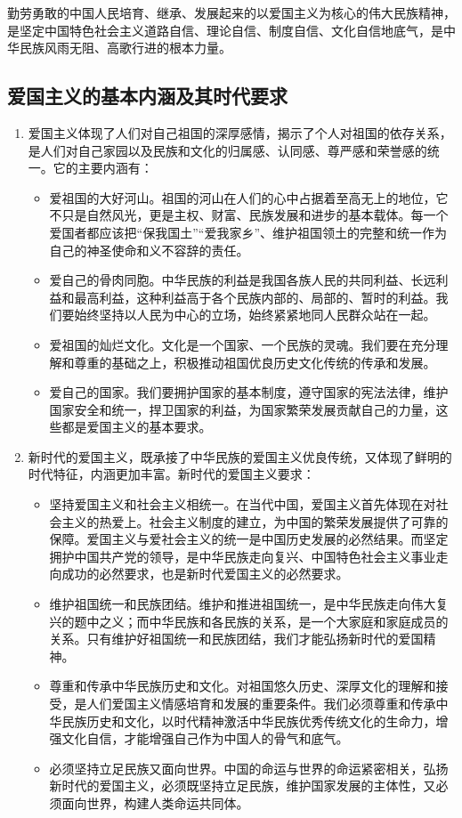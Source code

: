 勤劳勇敢的中国人民培育、继承、发展起来的以爱国主义为核心的伟大民族精神，是坚定中国特色社会主义道路自信、理论自信、制度自信、文化自信地底气，是中华民族风雨无阻、高歌行进的根本力量。

\subsection{爱国主义的基本内涵及其时代要求}
\begin{enumerate}
\item 爱国主义体现了人们对自己祖国的深厚感情，揭示了个人对祖国的依存关系，是人们对自己家园以及民族和文化的归属感、认同感、尊严感和荣誉感的统一。它的主要内涵有：
\begin{itemize}
\item 爱祖国的大好河山。祖国的河山在人们的心中占据着至高无上的地位，它不只是自然风光，更是主权、财富、民族发展和进步的基本载体。每一个爱国者都应该把“保我国土”“爱我家乡”、维护祖国领土的完整和统一作为自己的神圣使命和义不容辞的责任。
\item 爱自己的骨肉同胞。中华民族的利益是我国各族人民的共同利益、长远利益和最高利益，这种利益高于各个民族内部的、局部的、暂时的利益。我们要始终坚持以人民为中心的立场，始终紧紧地同人民群众站在一起。
\item 爱祖国的灿烂文化。文化是一个国家、一个民族的灵魂。我们要在充分理解和尊重的基础之上，积极推动祖国优良历史文化传统的传承和发展。
\item 爱自己的国家。我们要拥护国家的基本制度，遵守国家的宪法法律，维护国家安全和统一，捍卫国家的利益，为国家繁荣发展贡献自己的力量，这些都是爱国主义的基本要求。
\end{itemize}
\item 新时代的爱国主义，既承接了中华民族的爱国主义优良传统，又体现了鲜明的时代特征，内涵更加丰富。新时代的爱国主义要求：
\begin{itemize}
\item 坚持爱国主义和社会主义相统一。在当代中国，爱国主义首先体现在对社会主义的热爱上。社会主义制度的建立，为中国的繁荣发展提供了可靠的保障。爱国主义与爱社会主义的统一是中国历史发展的必然结果。而坚定拥护中国共产党的领导，是中华民族走向复兴、中国特色社会主义事业走向成功的必然要求，也是新时代爱国主义的必然要求。
\item 维护祖国统一和民族团结。维护和推进祖国统一，是中华民族走向伟大复兴的题中之义；而中华民族和各民族的关系，是一个大家庭和家庭成员的关系。只有维护好祖国统一和民族团结，我们才能弘扬新时代的爱国精神。
\item 尊重和传承中华民族历史和文化。对祖国悠久历史、深厚文化的理解和接受，是人们爱国主义情感培育和发展的重要条件。我们必须尊重和传承中华民族历史和文化，以时代精神激活中华民族优秀传统文化的生命力，增强文化自信，才能增强自己作为中国人的骨气和底气。
\item 必须坚持立足民族又面向世界。中国的命运与世界的命运紧密相关，弘扬新时代的爱国主义，必须既坚持立足民族，维护国家发展的主体性，又必须面向世界，构建人类命运共同体。
\end{itemize}
\end{enumerate}

